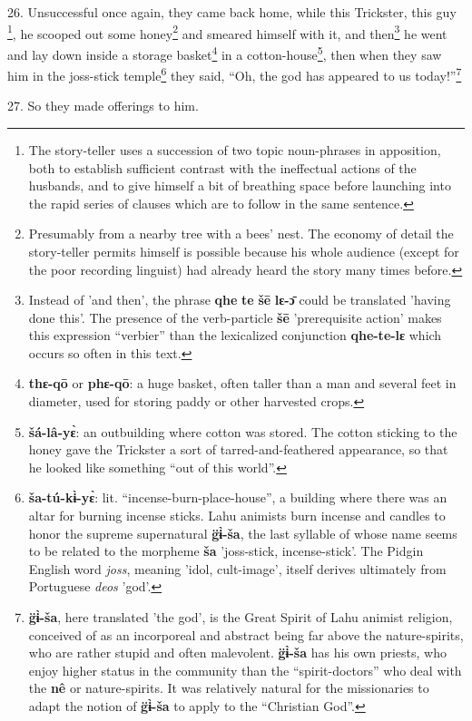 26. Unsuccessful once again, they came back home, while this Trickster, this guy
\footnote{The story-teller uses a succession of two topic noun-phrases in apposition, both to establish sufficient contrast with the ineffectual actions of the husbands, and to give himself a bit of breathing space before launching into the rapid series of clauses which are to follow in the same sentence.}, he scooped out some honey\footnote{Presumably from a nearby tree with a bees' nest. The economy of detail the story-teller permits himself is possible because his whole audience (except for the poor recording linguist) had already heard the story many times before.} and smeared himself with it, and then\footnote{Instead of 'and then', the phrase \textbf{qhe} \textbf{te} \textbf{šē} \textbf{lɛ-ɔ̄} could be translated 'having done this'. The presence of the verb-particle \textbf{šē} 'prerequisite action' makes this expression ``verbier'' than the lexicalized conjunction \textbf{qhe-te-lɛ} which occurs so often in this text.}
he went and lay down inside a storage basket\footnote{\textbf{thɛ-qō} or \textbf{phɛ-qō}: a huge basket, often taller than a man and several feet in diameter, used for storing paddy or other harvested crops.} in a cotton-house\footnote{\textbf{šá-lâ-yɛ̀}: an outbuilding where cotton was stored. The cotton sticking to the honey gave the Trickster a sort of tarred-and-feathered appearance, so that he looked like something ``out of this world''.}, then
when they saw him in the joss-stick temple\footnote{\textbf{ša-tú-kɨ̀-yɛ̀}: lit. ``incense-burn-place-house'', a building where there was an altar for burning incense sticks. Lahu animists burn incense and candles to honor the supreme supernatural \textbf{g̈ɨ̀-ša}, the last syllable of whose name seems to be related to the morpheme \textbf{ša} 'joss-stick, incense-stick'. The Pidgin English word \textit{joss}, meaning 'idol, cult-image', itself derives ultimately from Portuguese \textit{deos} 'god'.} they said, ``Oh, the god has appeared
to us today!''\footnote{\textbf{g̈ɨ̀-ša}, here translated 'the god', is the Great Spirit of Lahu animist religion, conceived of as an incorporeal and abstract being far above the nature-spirits, who are rather stupid and often malevolent. \textbf{g̈ɨ̀-ša} has his own priests, who enjoy higher status in the community than the ``spirit-doctors'' who deal with the \textbf{nê} or nature-spirits. It was relatively natural for the missionaries to adapt the notion of \textbf{g̈ɨ̀-ša} to apply to the ``Christian God''.}

27. So they made offerings to him.

